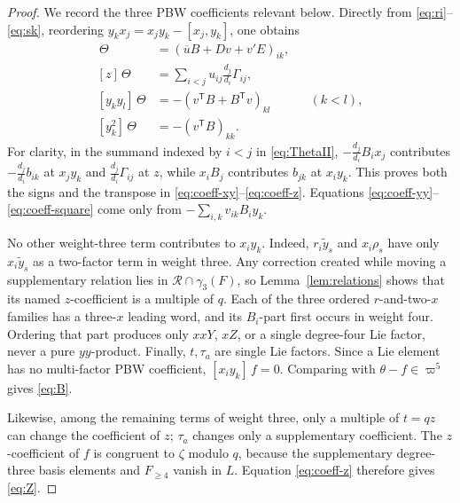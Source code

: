 \documentclass[11pt]{amsart}
\theoremstyle{definition}
\theoremstyle{remark}
\newcommand{\gam}{\gamma}
\newcommand{\ww}{\varpi}
\newcommand{\coeff}[1]{[#1]\,}
\begin{document}
\begin{proof}
We record the three PBW coefficients relevant below.  Directly from
\eqref{eq:ri}--\eqref{eq:sk}, reordering
\(y_kx_j=x_jy_k-[x_j,y_k]\), one obtains
\begin{align}
 \coeff{x_i y_k}\Theta
   &=(\overline uB+Dv+v'E)_{ik},\label{eq:coeff-xy}\\
 \coeff{z}\Theta
   &=\sum_{i<j}u_{ij}\frac{d_j}{d_i}\Gamma_{ij},
       \label{eq:coeff-z}\\
 \coeff{y_ky_l}\Theta
   &=-(v^{\mathsf T}B+B^{\mathsf T}v)_{kl}
       &&(k<l),\label{eq:coeff-yy}\\
 \coeff{y_k^2}\Theta
   &=-(v^{\mathsf T}B)_{kk}.\label{eq:coeff-square}
\end{align}
For clarity, in the summand indexed by \(i<j\) in
\eqref{eq:ThetaII},
\(-\frac{d_j}{d_i}B_ix_j\) contributes
\(-\frac{d_j}{d_i}b_{ik}\) at \(x_jy_k\) and
\(\frac{d_j}{d_i}\Gamma_{ij}\) at \(z\), while
\(x_iB_j\) contributes \(b_{jk}\) at \(x_iy_k\).
This proves both the signs and the transpose in
\eqref{eq:coeff-xy}--\eqref{eq:coeff-z}.  Equations
\eqref{eq:coeff-yy}--\eqref{eq:coeff-square} come only from
\(-\sum_{i,k}v_{ik}B_iy_k\).

No other weight-three term contributes to \(x_iy_k\).  Indeed,
\(r_i\widetilde y_s\) and \(x_i\rho_s\) have only
\(x_i\widetilde y_s\) as a two-factor term in weight three.  Any
correction created while moving a supplementary relation lies in
\(\mathcal R\cap\gam_3(F)\), so Lemma~\ref{lem:relations} shows that
its named \(z\)-coefficient is a multiple of \(q\).  Each of the three
ordered \(r\)-and-two-\(x\) families has a three-\(x\) leading word,
and its \(B_i\)-part first occurs in weight four.  Ordering that part
produces only \(xxY\), \(xZ\), or a single degree-four Lie factor,
never a pure \(yy\)-product.  Finally,
\(t,\tau_a\) are single Lie factors.  Since a Lie element has no
multi-factor PBW
coefficient, \(\coeff{x_iy_k}f=0\).  Comparing with
\(\theta-f\in\ww^5\) gives \eqref{eq:B}.

Likewise, among the remaining terms of weight three, only a multiple
of \(t=qz\) can change the coefficient of \(z\); \(\tau_a\) changes
only a supplementary coefficient.  The \(z\)-coefficient of \(f\)
is congruent to \(\zeta\) modulo \(q\), because the supplementary
degree-three basis elements and \(F_{\geq4}\) vanish in \(L\).
Equation \eqref{eq:coeff-z} therefore gives \eqref{eq:Z}.


\end{proof}
\end{document}
